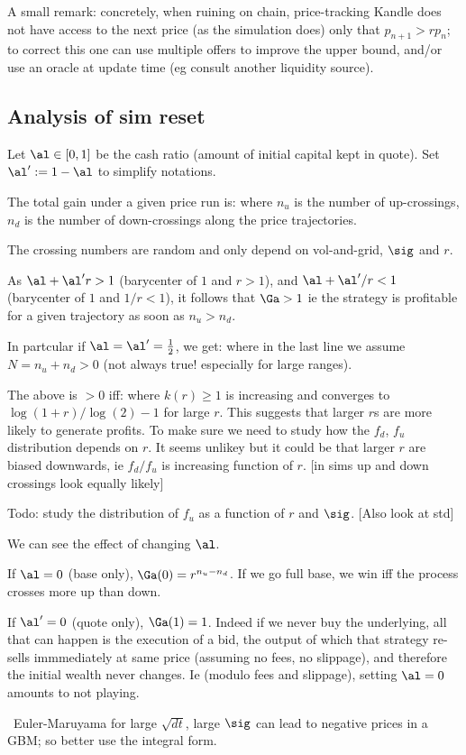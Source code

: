 \documentclass[oneside]{article}
\begin{document}
A small remark: concretely, when ruining on chain, price-tracking Kandle does not have access to the next price (as the simulation does)
only that $p_{n+1}>r p_n$;
to correct this one can use multiple offers to improve the upper bound,
and/or use an oracle at update time (eg consult another liquidity source).


\subsection{Analysis of sim reset}

Let $\al\in[0,1]$ be the cash ratio (amount of initial capital kept in quote).
Set $\al':=1-\al$ to simplify notations.

The total gain under a given price run is:
where $n_u$ is the number of up-crossings, $n_d$
is the number of down-crossings along the price trajectories.

The crossing numbers are random and only depend on vol-and-grid, $\sig$ and $r$.

As
$\al+\al' r>1$ (barycenter of $1$ and $r>1$), and  
$\al+\al'/r<1$ (barycenter of $1$ and $1/r<1$),
it follows that $\Ga>1$ ie the strategy is profitable for a given trajectory as soon as $n_u>n_d$.

In partcular if $\al=\al'=\frac12$, we get:
where in the last line we assume $N=n_u+n_d>0$ (not always true! especially for large ranges).

The above is $>0$ iff:
where $k(r)\geq 1$ is increasing and converges to $\log(1+r)/\log(2) -1$ for large $r$.
This suggests that  larger $r$s are more likely to generate profits. To make sure we need
to study how the $f_d$, $f_u$ distribution depends on $r$. It seems unlikey but it could be that larger $r$ are biased 
downwards, ie $f_d/f_u$ is increasing function of $r$. [in sims up and down crossings 
look equally likely]

Todo: study the distribution of $f_u$ as a function of $r$ and $\sig$. [Also look at std]

We can see the effect of changing $\al$.

If $\al=0$ (base only), $\Ga(0) = r^{n_u-n_d}$. If we go full base,
we win iff the process crosses more up than down.

If $\al'=0$ (quote only), $\Ga(1) = 1$. Indeed if we never buy the underlying,
all that can happen is the execution of a bid, 
the output of which that strategy re-sells immmediately at same price (assuming no fees, no slippage),
and therefore the initial wealth never changes. Ie (modulo fees and slippage), setting $\al=0$ amounts to not playing.


\NB\ Euler-Maruyama for large $\sqrt{dt}$, large $\sig$ can lead to negative prices in a GBM;
so better use the integral form. 
\end{document}
